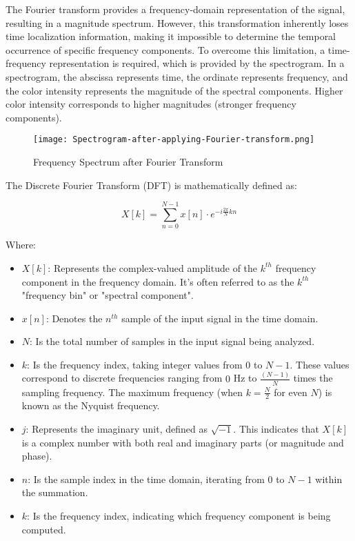 The Fourier transform provides a frequency-domain
representation of the signal, resulting in a magnitude
spectrum. However, this transformation inherently loses time
localization information, making it impossible to determine
the temporal occurrence of specific frequency components. To
overcome this limitation, a time-frequency representation is
required, which is provided by the spectrogram. In a
spectrogram, the abscissa represents time, the ordinate
represents frequency, and the color intensity represents the
magnitude of the spectral components. Higher color intensity
corresponds to higher magnitudes (stronger frequency components).

\vspace{-1em}
\begin{figure}[H]
    \centering
    \texttt{[image: Spectrogram-after-applying-Fourier-transform.png]}
    \caption{Frequency Spectrum after Fourier Transform}
    \label{fig:spectrogram-after-applying-fourier-transform}
\end{figure}
\vspace{-1em}

The Discrete Fourier Transform (DFT) is mathematically defined
as:

\begin{equation}
    X[k] = \sum_{n=0}^{N-1} x[n] \cdot e^{-i \frac{2\pi}{N}kn}
\end{equation}

Where:
\begin{itemize}
    \item $X[k]$: Represents the complex-valued amplitude of the
          $k^{th}$ frequency component in the frequency domain. It's
          often referred to as the $k^{th}$ "frequency bin" or "spectral
          component".

    \item $x[n]$: Denotes the $n^{th}$ sample of the input signal
          in the time domain.

    \item $N$: Is the total number of samples in the input
          signal being analyzed.

    \item $k$: Is the frequency index, taking integer values
          from $0$ to $N-1$. These values correspond to discrete
          frequencies ranging from $0$ Hz to $\frac{(N-1)}{N}$ times the
          sampling frequency. The maximum frequency (when $k = \frac{N}{2}$
          for even $N$) is known as the Nyquist frequency.

    \item $j$: Represents the imaginary unit, defined as $\sqrt{-1}$.
          This indicates that $X[k]$ is a complex number with both
          real and imaginary parts (or magnitude and phase).

    \item $n$: Is the sample index in the time domain,
          iterating from $0$ to $N-1$ within the summation.

    \item $k$: Is the frequency index, indicating which
          frequency component is being computed.

\end{itemize}

